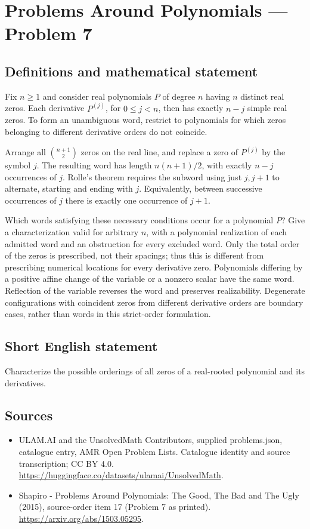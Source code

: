 \documentclass[11pt,a4paper]{article}
\begin{document}
\section*{Problems Around Polynomials — Problem 7}\label{statement}

\subsection{Definitions and mathematical statement}
Fix $n\geq1$ and consider real polynomials $P$ of degree $n$ having
$n$ distinct real zeros. Each derivative $P^{(j)}$, for
$0\leq j<n$, then has exactly $n-j$ simple real zeros. To form an
unambiguous word, restrict to polynomials for which zeros belonging
to different derivative orders do not coincide.

Arrange all $\binom{n+1}{2}$ zeros on the real line, and replace a
zero of $P^{(j)}$ by the symbol $j$. The resulting word has length
$n(n+1)/2$, with exactly $n-j$ occurrences of $j$. Rolle's theorem
requires the subword using just $j,j+1$ to alternate, starting and
ending with $j$. Equivalently, between successive occurrences of
$j$ there is exactly one occurrence of $j+1$.

Which words satisfying these necessary conditions occur for a
polynomial $P$? Give a characterization valid for arbitrary $n$,
with a polynomial realization of each admitted word and an
obstruction for every excluded word. Only the total order of the
zeros is prescribed, not their spacings; thus this is different from
prescribing numerical locations for every derivative zero.
Polynomials differing by a positive affine change of the variable
or a nonzero scalar have the same word. Reflection of the variable
reverses the word and preserves realizability. Degenerate
configurations with coincident zeros from different derivative
orders are boundary cases, rather than words in this strict-order
formulation.
\subsection{Short English statement}
Characterize the possible orderings of all zeros of a real-rooted polynomial and its derivatives.
\subsection{Sources}
\begin{itemize}
\item[S1] ULAM.AI and the UnsolvedMath Contributors, supplied problems.json, catalogue entry, AMR Open Problem Lists. Catalogue identity and source transcription; CC BY 4.0.
\url{https://huggingface.co/datasets/ulamai/UnsolvedMath}.
\item[S2] Shapiro - Problems Around Polynomials: The Good, The Bad and The Ugly (2015), source-order item 17 (Problem 7 as printed). 
\url{https://arxiv.org/abs/1503.05295}.
\end{itemize}
\end{document}
